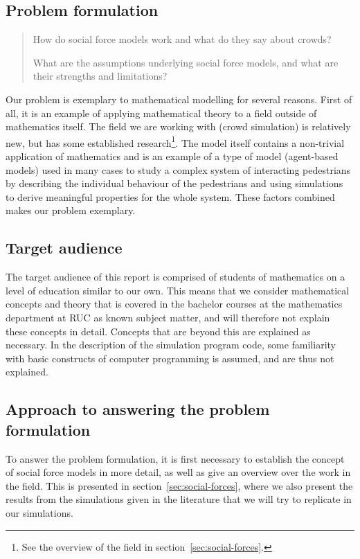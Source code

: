 \subsection{Problem formulation}
\begin{quote}
    How do social force models work and what do they say about crowds?

    What are the assumptions underlying social force models, and what are 
    their strengths and limitations?
\end{quote}

Our problem is exemplary to mathematical modelling for several reasons. First 
of all, it is an example of applying mathematical theory to a field outside of 
mathematics itself. The field we are working with (crowd simulation) is 
relatively new, but has some established research\footnote{See the overview of 
the field in section~\ref{sec:social-forces}.}. The model itself contains a 
non-trivial application of mathematics and is an example of a type of model 
(agent-based models) used in many cases to study a complex system of 
interacting pedestrians by describing the individual behaviour of the pedestrians and 
using simulations to derive meaningful properties for the whole system. These 
factors combined makes our problem exemplary.

\subsection{Target audience}
The target audience of this report is comprised of students of mathematics on 
a level of education similar to our own. This means that we consider 
mathematical concepts and theory that is covered in the bachelor courses at 
the mathematics department at RUC as known subject matter, and will therefore 
not explain these concepts in detail. Concepts that are beyond this are 
explained as necessary. In the description of the simulation program code, 
some familiarity with basic constructs of computer programming is assumed, and 
are thus not explained.

\subsection{Approach to answering the problem formulation}

To answer the problem formulation, it is first necessary to establish the 
concept of social force models in more detail, as well as give an overview 
over the work in the field. This is presented in 
section~\ref{sec:social-forces}, where we also present the results from the 
simulations given in the literature that we will try to replicate in our 
simulations.

